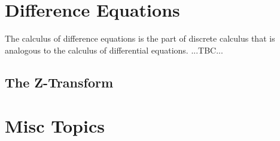 






\section{Difference Equations}
The calculus of difference equations is the part of discrete calculus that is analogous to the calculus of differential equations. ...TBC...



\subsection{The Z-Transform}





\section{Misc Topics}

